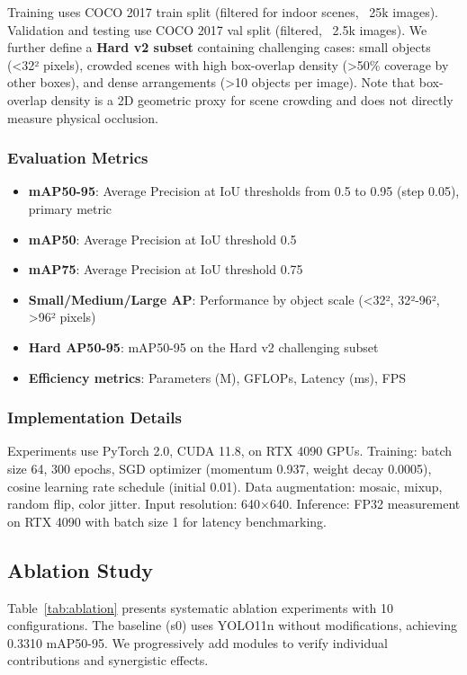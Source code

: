 \documentclass[journal]{IEEEtran}
\begin{document}
Training uses COCO 2017 train split (filtered for indoor scenes, ~25k images). Validation and testing use COCO 2017 val split (filtered, ~2.5k images). We further define a \textbf{Hard v2 subset} containing challenging cases: small objects (<32² pixels), crowded scenes with high box-overlap density (>50\% coverage by other boxes), and dense arrangements (>10 objects per image). Note that box-overlap density is a 2D geometric proxy for scene crowding and does not directly measure physical occlusion.

\subsubsection{Evaluation Metrics}

\begin{itemize}
    \item \textbf{mAP50-95}: Average Precision at IoU thresholds from 0.5 to 0.95 (step 0.05), primary metric
    \item \textbf{mAP50}: Average Precision at IoU threshold 0.5
    \item \textbf{mAP75}: Average Precision at IoU threshold 0.75
    \item \textbf{Small/Medium/Large AP}: Performance by object scale (<32², 32²-96², >96² pixels)
    \item \textbf{Hard AP50-95}: mAP50-95 on the Hard v2 challenging subset
    \item \textbf{Efficiency metrics}: Parameters (M), GFLOPs, Latency (ms), FPS
\end{itemize}

\subsubsection{Implementation Details}

Experiments use PyTorch 2.0, CUDA 11.8, on RTX 4090 GPUs. Training: batch size 64, 300 epochs, SGD optimizer (momentum 0.937, weight decay 0.0005), cosine learning rate schedule (initial 0.01). Data augmentation: mosaic, mixup, random flip, color jitter. Input resolution: 640×640. Inference: FP32 measurement on RTX 4090 with batch size 1 for latency benchmarking.

\subsection{Ablation Study}

Table~\ref{tab:ablation} presents systematic ablation experiments with 10 configurations. The baseline (s0) uses YOLO11n without modifications, achieving 0.3310 mAP50-95. We progressively add modules to verify individual contributions and synergistic effects.
\end{document}
